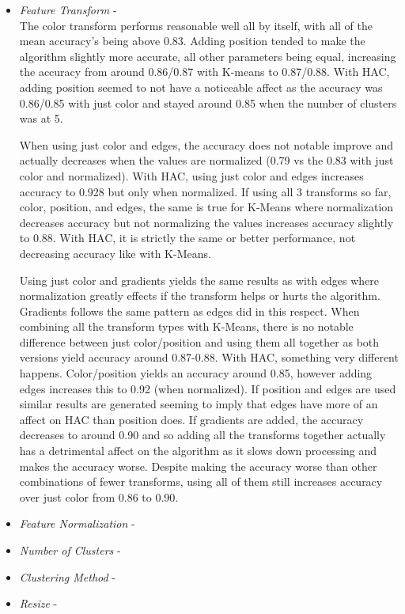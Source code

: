 \documentclass[12pt]{article}
\begin{document}
\begin{itemize}
	\item \textit{Feature Transform} - \\
		The color transform performs reasonable well all by itself, with all of the mean accuracy's being above 0.83. Adding position tended to make the algorithm slightly more accurate, all other parameters being equal, increasing the accuracy from around  0.86/0.87 with K-means to 0.87/0.88. With HAC, adding position seemed to not have a noticeable affect as the accuracy was 0.86/0.85 with just color and stayed around 0.85 when the number of clusters was at 5. 
		
		When using just color and edges, the accuracy does not notable improve and actually decreases when the values are normalized (0.79 vs the 0.83 with just color and normalized). With HAC, using just color and edges increases accuracy to 0.928 but only when normalized. If using all 3 transforms so far, color, position, and edges, the same is true for K-Means where normalization decreases accuracy but not normalizing the values increases accuracy slightly to 0.88. With HAC, it is strictly the same or better performance, not decreasing accuracy like with K-Means. 
		
		Using just color and gradients yields the same results as with edges where normalization greatly effects if the transform helps or hurts the algorithm. Gradients follows the same pattern as edges did in this respect. When combining all the transform types with K-Means, there is no notable difference between just color/position and using them all together as both versions yield accuracy around 0.87-0.88. With HAC, something very different happens. Color/position yields an accuracy around 0.85, however adding edges increases this to 0.92 (when normalized). If position and edges are used similar results are generated seeming to imply that edges have more of an affect on HAC than position does. If gradients are added, the accuracy decreases to around 0.90 and so adding all the transforms together actually has a detrimental affect on the algorithm as it slows down processing and makes the accuracy worse. Despite making the accuracy worse than other combinations of fewer transforms, using all of them still increases accuracy over just color from 0.86 to 0.90.
	
	\item \textit{Feature Normalization} - \\
	
	
	\item \textit{Number of Clusters} -
	\item \textit{Clustering Method} - 
	\item \textit{Resize} - 
\end{itemize}
\end{document}
